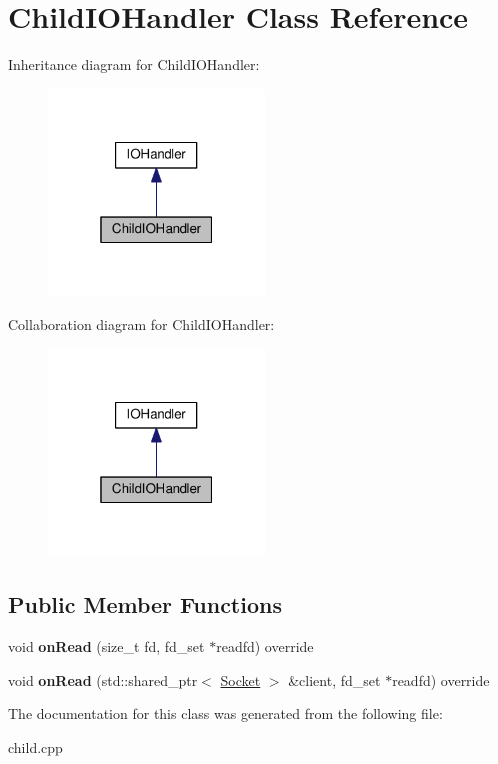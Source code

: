 \hypertarget{classChildIOHandler}{}\section{Child\+I\+O\+Handler Class Reference}
\label{classChildIOHandler}


Inheritance diagram for Child\+I\+O\+Handler\+:\nopagebreak
\begin{figure}[H]
\begin{center}
\leavevmode
\includegraphics[width=163pt]{classChildIOHandler__inherit__graph}
\end{center}
\end{figure}


Collaboration diagram for Child\+I\+O\+Handler\+:\nopagebreak
\begin{figure}[H]
\begin{center}
\leavevmode
\includegraphics[width=163pt]{classChildIOHandler__coll__graph}
\end{center}
\end{figure}
\subsection*{Public Member Functions}
\begin{DoxyCompactItemize}
\item 
void {\bfseries on\+Read} (size\+\_\+t fd, fd\+\_\+set $\ast$readfd) override\hypertarget{classChildIOHandler_a9838d8ec92e09028459171f834371f0f}{}\label{classChildIOHandler_a9838d8ec92e09028459171f834371f0f}

\item 
void {\bfseries on\+Read} (std\+::shared\+\_\+ptr$<$ \hyperlink{classSocket}{Socket} $>$ \&client, fd\+\_\+set $\ast$readfd) override\hypertarget{classChildIOHandler_acd3941962eb3d34505348be79f151334}{}\label{classChildIOHandler_acd3941962eb3d34505348be79f151334}

\end{DoxyCompactItemize}


The documentation for this class was generated from the following file\+:\begin{DoxyCompactItemize}
\item 
child.\+cpp\end{DoxyCompactItemize}
